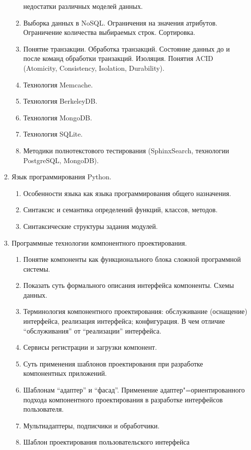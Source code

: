 \documentclass[final,a4paper,12pt]{report}
\begin{document}
\begin{enumerate}
\begin{enumerate}
    недостатки различных моделей данных.
  \item Выборка данных в NoSQL. Ограничения на значения
    атрибутов. Ограничение количества выбираемых строк. Сортировка.
  \item Понятие транзакции. Обработка транзакций. Состояние данных до
    и после команд обработки транзакций. Изоляция. Понятия ACID
    (Atomicity, Consistency, Isolation, Durability).
  \item Технология Memcache.
  \item Технология BerkeleyDB.
  \item Технология MongoDB.
  \item Технология SQLite.
  \item Методики полнотекстового тестирования (SphinxSearch,
    технологии PostgreSQL, MongoDB).
  \end{enumerate}
\item Язык программирования Python.
  \begin{enumerate}
  \item Особенности языка как языка программирования общего
    назначения.
  \item Синтаксис и семантика определений функций, классов, методов.
  \item Синтаксические структуры задания модулей.
  \end{enumerate}
\item Программные технологии компонентного проектирования.
  \begin{enumerate}
  \item Понятие компоненты как функционального блока сложной
    программной системы.
  \item Показать суть формального описания интерфейса
    компоненты. Схемы данных.
  \item Терминология компонентного проектирования: обслуживание
    (оснащение) интерфейса, реализация интерфейса; конфигурация. В чем
    отличие “обслуживания” от “реализации” интерфейса.
  \item Сервисы регистрации и загрузки компонент.
  \item Суть применения шаблонов проектирования при разработке
    компонентных приложений.
  \item Шаблонам “адаптер” и “фасад”.  Применение
    адаптер"=ориентированного подхода компонентного проектирования в
    разработке интерфейсов пользователя.
  \item Мультиадаптеры, подписчики и обработчики.
  \item Шаблон проектирования пользовательского интерфейса

\end{enumerate}
\end{enumerate}
\end{document}
